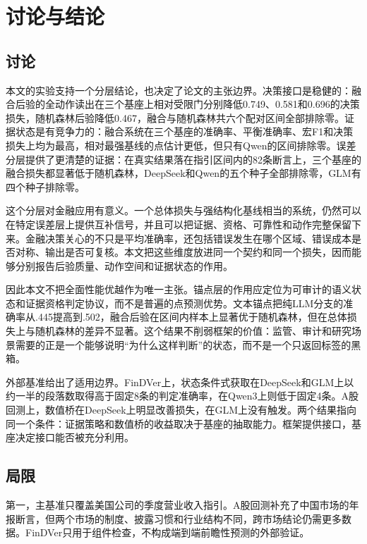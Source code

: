 \chapter{讨论与结论}
\label{ch:conclusion}

\section{讨论}

本文的实验支持一个分层结论，也决定了论文的主张边界。决策接口是稳健的：融合后验的全动作读出在三个基座上相对受限门分别降低0.749、0.581和0.696的决策损失，随机森林后验降低0.467，融合与随机森林共六个配对区间全部排除零。证据状态是有竞争力的：融合系统在三个基座的准确率、平衡准确率、宏F1和决策损失上均为最高，相对最强基线的点估计更低，但只有Qwen的区间排除零。误差分层提供了更清楚的证据：在真实结果落在指引区间内的82条断言上，三个基座的融合损失都显著低于随机森林，DeepSeek和Qwen的五个种子全部排除零，GLM有四个种子排除零。

这个分层对金融应用有意义。一个总体损失与强结构化基线相当的系统，仍然可以在特定误差层上提供互补信号，并且可以把证据、资格、可靠性和动作完整保留下来。金融决策关心的不只是平均准确率，还包括错误发生在哪个区域、错误成本是否对称、输出是否可复核。本文把这些维度放进同一个契约和同一个损失，因而能够分别报告后验质量、动作空间和证据状态的作用。

因此本文不把全面性能优越作为唯一主张。锚点层的作用应定位为可审计的语义状态和证据资格判定协议，而不是普遍的点预测优势。文本锚点把纯LLM分支的准确率从.445提高到.502，融合后验在区间内样本上显著优于随机森林，但在总体损失上与随机森林的差异不显著。这个结果不削弱框架的价值：监管、审计和研究场景需要的正是一个能够说明“为什么这样判断”的状态，而不是一个只返回标签的黑箱。

外部基准给出了适用边界。FinDVer上，状态条件式获取在DeepSeek和GLM上以约一半的段落数取得高于固定8条的判定准确率，在Qwen3上则低于固定4条。A股回测上，数值桥在DeepSeek上明显改善损失，在GLM上没有触发。两个结果指向同一个条件：证据策略和数值桥的收益取决于基座的抽取能力。框架提供接口，基座决定接口能否被充分利用。

\section{局限}

第一，主基准只覆盖美国公司的季度营业收入指引。A股回测补充了中国市场的年报断言，但两个市场的制度、披露习惯和行业结构不同，跨市场结论仍需更多数据。FinDVer只用于组件检查，不构成端到端前瞻性预测的外部验证。

